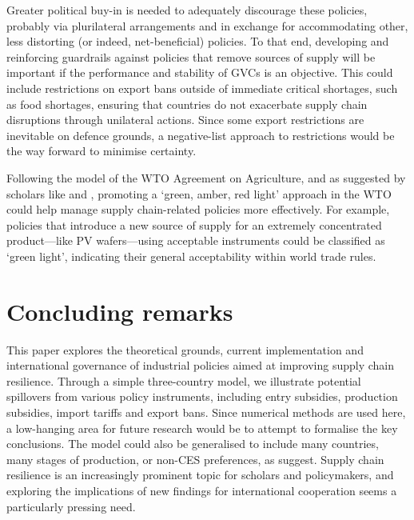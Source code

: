 \documentclass{article}
\begin{document}
Greater political buy-in is needed to adequately discourage these policies, probably via plurilateral arrangements and in exchange for accommodating other, less distorting (or indeed, net-beneficial) policies. To that end, developing and reinforcing guardrails against policies that remove sources of supply will be important if the performance and stability of GVCs is an objective. This could include restrictions on export bans outside of immediate critical shortages, such as food shortages, ensuring that countries do not exacerbate supply chain disruptions through unilateral actions. Since some export restrictions are inevitable on defence grounds, a negative-list approach to restrictions would be the way forward to minimise certainty.

Following the model of the WTO Agreement on Agriculture, and as suggested by scholars like \textcite{aguayo_ayala_preserving_2005} and \textcite{bown_wtoing_2019}, promoting a `green, amber, red light' approach in the WTO could help manage supply chain-related policies more effectively. For example, policies that introduce a new source of supply for an extremely concentrated product---like PV wafers---using acceptable instruments could be classified as `green light', indicating their general acceptability within world trade rules.

\section{Concluding remarks}

This paper explores the theoretical grounds, current implementation and international governance of industrial policies aimed at improving supply chain resilience. Through a simple three-country model, we illustrate potential spillovers from various policy instruments, including entry subsidies, production subsidies, import tariffs and export bans. Since numerical methods are used here, a low-hanging area for future research would be to attempt to formalise the key conclusions. The model could also be generalised to include many countries, many stages of production, or non-CES preferences, as \textcite{grossman_supply_2023} suggest. Supply chain resilience is an increasingly prominent topic for scholars and policymakers, and exploring the implications of new findings for international cooperation seems a particularly pressing need.

\nocite{dcceew_department_of_climate_change_energy_the_environment_and_water_securing_2022}
\end{document}
